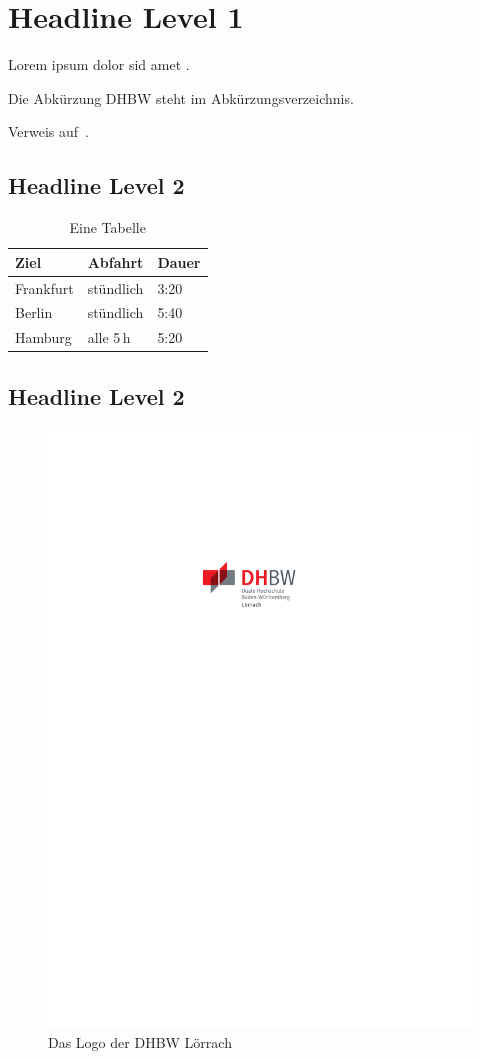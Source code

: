 \section{Headline Level 1}
\lipsum[1-2]

Lorem ipsum dolor sid amet \autocite{mcconnell2004}.

Die Abkürzung DHBW steht im Abkürzungsverzeichnis.

Verweis auf~.

\subsection{Headline Level 2}
\lipsum[1]

\begin{table}[htbp]
    \caption{Eine Tabelle}
    \label{tab:tabelle}
    \centering
    \begin{tabular}{lll}
        \toprule
        Ziel      & Abfahrt   & Dauer \\
        \midrule
        Frankfurt & stündlich & 3:20  \\
        Berlin    & stündlich & 5:40  \\
        Hamburg   & alle 5\,h & 5:20  \\
        \bottomrule
    \end{tabular}
\end{table}

\subsection{Headline Level 2}
\lipsum[1]

\begin{figure}[htbp]
    \centering
    \includegraphics[scale=1.6]{figures/DHBW_d_LOE_46mm_4c.pdf}
    \caption{Das Logo der DHBW Lörrach}
    \label{fig:logo}
\end{figure}
